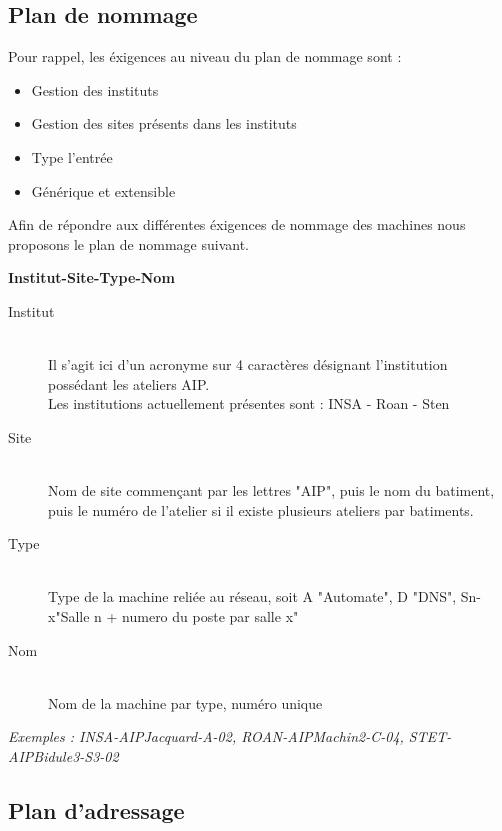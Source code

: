 \documentclass[a4paper]{article}
\begin{document}
	\subsection{Plan de nommage}

	Pour rappel, les éxigences au niveau du plan de nommage sont :\\
	\begin{itemize}
	\item Gestion des instituts
	\item Gestion des sites présents dans les instituts
	\item Type l'entrée
	\item Générique et extensible
	\end{itemize}	

	Afin de répondre aux différentes éxigences de nommage des machines nous proposons le plan de nommage suivant.	
	
	\textbf{Institut-Site-Type-Nom}	
	
	\begin{description}
	\item[Institut]\hfill\\
	Il s'agit ici d'un acronyme sur 4 caractères désignant l'institution possédant les ateliers AIP.\\
	Les institutions actuellement présentes sont :  INSA - Roan - Sten
	
	\item[Site]\hfill\\
	Nom de site commençant par les lettres "AIP", puis le nom du batiment, puis le numéro de l'atelier si il existe plusieurs ateliers par batiments.
	
	\item[Type]\hfill\\
	Type de la machine reliée au réseau, soit A "Automate", D "DNS", Sn-x"Salle n + numero du poste par salle x"	
	
	\item[Nom]\hfill\\
	Nom de la machine par type, numéro unique	
	\end{description}	
	
	\textit{Exemples : INSA-AIPJacquard-A-02, ROAN-AIPMachin2-C-04, STET-AIPBidule3-S3-02}	
	

	\subsection{Plan d'adressage}

	
\end{document}
